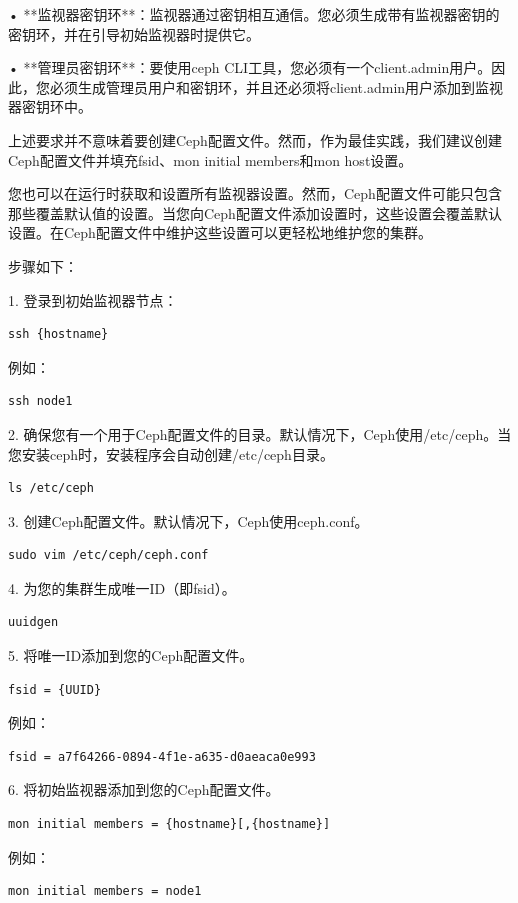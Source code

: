 \documentclass[12pt,UTF8]{ctexbook}
\begin{document}
• **监视器密钥环**：监视器通过密钥相互通信。您必须生成带有监视器密钥的密钥环，并在引导初始监视器时提供它。

• **管理员密钥环**：要使用ceph CLI工具，您必须有一个client.admin用户。因此，您必须生成管理员用户和密钥环，并且还必须将client.admin用户添加到监视器密钥环中。

上述要求并不意味着要创建Ceph配置文件。然而，作为最佳实践，我们建议创建Ceph配置文件并填充fsid、mon initial members和mon host设置。

您也可以在运行时获取和设置所有监视器设置。然而，Ceph配置文件可能只包含那些覆盖默认值的设置。当您向Ceph配置文件添加设置时，这些设置会覆盖默认设置。在Ceph配置文件中维护这些设置可以更轻松地维护您的集群。

步骤如下：

1. 登录到初始监视器节点：
\begin{verbatim}
ssh {hostname}
\end{verbatim}

例如：
\begin{verbatim}
ssh node1
\end{verbatim}

2. 确保您有一个用于Ceph配置文件的目录。默认情况下，Ceph使用/etc/ceph。当您安装ceph时，安装程序会自动创建/etc/ceph目录。
\begin{verbatim}
ls /etc/ceph
\end{verbatim}

3. 创建Ceph配置文件。默认情况下，Ceph使用ceph.conf。
\begin{verbatim}
sudo vim /etc/ceph/ceph.conf
\end{verbatim}

4. 为您的集群生成唯一ID（即fsid）。
\begin{verbatim}
uuidgen
\end{verbatim}

5. 将唯一ID添加到您的Ceph配置文件。
\begin{verbatim}
fsid = {UUID}
\end{verbatim}

例如：
\begin{verbatim}
fsid = a7f64266-0894-4f1e-a635-d0aeaca0e993
\end{verbatim}

6. 将初始监视器添加到您的Ceph配置文件。
\begin{verbatim}
mon initial members = {hostname}[,{hostname}]
\end{verbatim}

例如：
\begin{verbatim}
mon initial members = node1
\end{verbatim}
\end{document}
